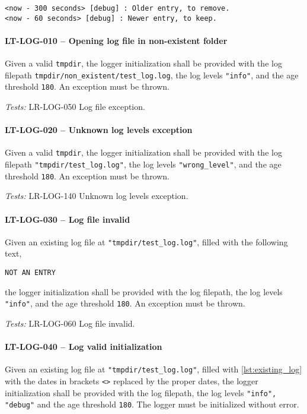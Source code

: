 \begin{minipage}{\linewidth}
  \begin{lstlisting}[caption={Existing log file with old and new entries},
    label={lst:existing_log}]
<now - 300 seconds> [debug] : Older entry, to remove.
<now - 60 seconds> [debug] : Newer entry, to keep.
\end{lstlisting} \end{minipage}

\paragraph{LT-LOG-010 -- Opening log file in non-existent folder}
Given a valid \lstinline{tmpdir}, the logger initialization
shall be provided with the log filepath
\lstinline{tmpdir/non_existent/test_log.log},
the log levels \lstinline{"info"}, and the age threshold \lstinline{180}.
An exception must be thrown.

\textit{Tests: } LR-LOG-050 Log file exception.

\paragraph{LT-LOG-020 -- Unknown log levels exception}
Given a valid \lstinline{tmpdir}, the logger initialization
shall be provided with the log filepath \lstinline{"tmpdir/test_log.log"},
the log levels \lstinline{"wrong_level"}, and the age threshold
\lstinline{180}.
An exception must be thrown.

\textit{Tests: } LR-LOG-140 Unknown log levels exception.

\paragraph{LT-LOG-030 -- Log file invalid}
Given an existing log file at \lstinline{"tmpdir/test_log.log"},
filled with the following text,
\begin{lstlisting}
NOT AN ENTRY
\end{lstlisting}
the logger initialization shall be provided with the log filepath,
the log levels \lstinline{"info"}, and the age threshold \lstinline{180}.
An exception must be thrown.

\textit{Tests: } LR-LOG-060 Log file invalid.

\paragraph{LT-LOG-040 -- Log valid initialization}
Given an existing log file at \lstinline{"tmpdir/test_log.log"},
filled with \cref{lst:existing_log} with the dates in brackets \lstinline{<>}
replaced by the proper dates, the logger initialization shall be
provided with the log filepath, the log levels \lstinline{"info", "debug"}
and the age threshold \lstinline{180}.
The logger must be initialized without error.

